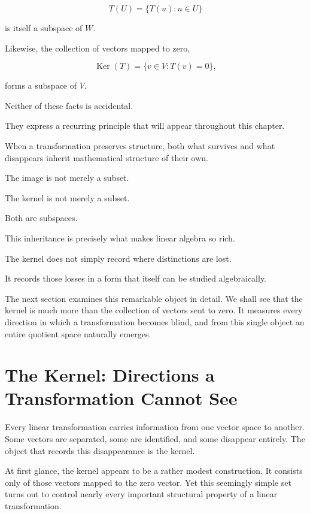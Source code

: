 \documentclass[11pt]{book}
\numberwithin{equation}{chapter}
\theoremstyle{definition}
\theoremstyle{plain}
\theoremstyle{remark}
\DeclareMathOperator{\Ker}{Ker}
\begin{document}
\[
T(U)
=
\{T(u):u\in U\}
\]

is itself a subspace of \(W\).

Likewise, the collection of vectors mapped to zero,

\[
\Ker(T)
=
\{v\in V:T(v)=0\},
\]

forms a subspace of \(V\).

Neither of these facts is accidental.

They express a recurring principle that will appear throughout this chapter.

When a transformation preserves structure, both what survives and what disappears inherit mathematical structure of their own.

The image is not merely a subset.

The kernel is not merely a subset.

Both are subspaces.

This inheritance is precisely what makes linear algebra so rich.

The kernel does not simply record where distinctions are lost.

It records those losses in a form that itself can be studied algebraically.

The next section examines this remarkable object in detail. We shall see that the kernel is much more than the collection of vectors sent to zero. It measures every direction in which a transformation becomes blind, and from this single object an entire quotient space naturally emerges.


\section{The Kernel: Directions a Transformation Cannot See}

Every linear transformation carries information from one vector space to another. Some vectors are separated, some are identified, and some disappear entirely. The object that records this disappearance is the kernel.

At first glance, the kernel appears to be a rather modest construction. It consists only of those vectors mapped to the zero vector. Yet this seemingly simple set turns out to control nearly every important structural property of a linear transformation.
\end{document}
